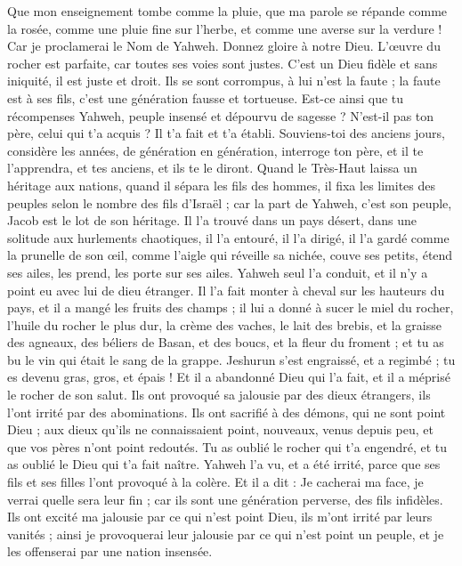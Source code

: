 \begin{multicols}{2}
Que mon enseignement tombe comme la pluie, que ma parole se répande comme la rosée, comme une pluie fine sur l'herbe, et comme une averse sur la verdure !
Car je proclamerai le Nom de Yahweh. Donnez gloire à notre Dieu.
L'œuvre du rocher\FTNT{} est parfaite, car toutes ses voies sont justes. C’est un Dieu fidèle et sans iniquité, il est juste et droit.
Ils se sont corrompus, à lui n’est la faute ; la faute est à ses fils, c’est une génération fausse et tortueuse.
Est-ce ainsi que tu récompenses Yahweh, peuple insensé et dépourvu de sagesse ? N'est-il pas ton père, celui qui t'a acquis ? Il t'a fait et t'a établi.
Souviens-toi des anciens jours, considère les années, de génération en génération, interroge ton père, et il te l'apprendra, et tes anciens, et ils te le diront.
Quand le Très-Haut laissa un héritage aux nations, quand il sépara les fils des hommes, il fixa les limites des peuples selon le nombre des fils d'Israël ;
car la part de Yahweh, c'est son peuple, Jacob est le lot de son héritage.
Il l'a trouvé dans un pays désert, dans une solitude aux hurlements chaotiques, il l'a entouré, il l'a dirigé, il l'a gardé comme la prunelle de son œil,
comme l'aigle qui réveille sa nichée, couve ses petits, étend ses ailes, les prend, les porte sur ses ailes.
Yahweh seul l'a conduit, et il n'y a point eu avec lui de dieu étranger.
Il l'a fait monter à cheval sur les hauteurs du pays, et il a mangé les fruits des champs ; il lui a donné à sucer le miel du rocher, l'huile du rocher le plus dur,
la crème des vaches, le lait des brebis, et la graisse des agneaux, des béliers de Basan, et des boucs, et la fleur du froment ; et tu as bu le vin qui était le sang de la grappe.
Jeshurun\FTNT{} s'est engraissé, et a regimbé ; tu es devenu gras, gros, et épais ! Et il a abandonné Dieu qui l'a fait, et il a méprisé le rocher de son salut.
Ils ont provoqué sa jalousie par des dieux étrangers, ils l'ont irrité par des abominations.
Ils ont sacrifié à des démons, qui ne sont point Dieu ; aux dieux qu'ils ne connaissaient point, nouveaux, venus depuis peu, et que vos pères n'ont point redoutés.
Tu as oublié le rocher qui t'a engendré, et tu as oublié le Dieu qui t'a fait naître.
Yahweh l'a vu, et a été irrité, parce que ses fils et ses filles l'ont provoqué à la colère.
Et il a dit : Je cacherai ma face, je verrai quelle sera leur fin ; car ils sont une génération perverse, des fils infidèles.
Ils ont excité ma jalousie par ce qui n'est point Dieu, ils m’ont irrité par leurs vanités ; ainsi je provoquerai leur jalousie par ce qui n'est point un peuple, et je les offenserai par une nation insensée.

\end{multicols}

